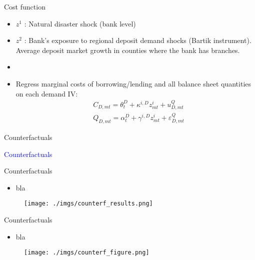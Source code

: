 \documentclass[notes,11pt, aspectratio=169]{beamer}
\begin{document}
      \begin{frame}{Cost function}\label{cost}
        \vspace{0.5cm}

          \begin{itemize}

\item  $z^1$ : Natural disaster shock (bank level)
\item  $z^2$ : Bank's exposure to regional deposit demand shocks (Bartik instrument). Average deposit market growth in counties where the bank has branches.
\item  
\item  Regress marginal costs of borrowing/lending and all balance sheet quantities on each demand IV: %
$$
\begin{aligned}
& C_{D, m t}=\theta_t^D+\kappa^{i, D} z_{m t}^i+u_{D, m t}^Q \\
& Q_{D, m t}=\alpha_t^D+\gamma^{i, D} z_{m t}^i+\varepsilon_{D, m t}^Q
\end{aligned}
$$

\end{itemize}
\end{frame}

\begin{frame}{Counterfactuals}
    \textcolor{blue}{\huge{\centerline{Counterfactuals}}}
\end{frame}

\begin{frame}{Counterfactuals}
    \vspace{0.5cm}
      \begin{itemize}
        \item  bla
      \end{itemize}
      
        \begin{figure}[t*]
          \centering
    
          \texttt{[image: ./imgs/counterf\_results.png]}
        \end{figure}
        
      \end{frame}

\begin{frame}{Counterfactuals}
    \vspace{0.5cm}
      \begin{itemize}
        \item  bla
      \end{itemize}
      
        \begin{figure}[t*]
          \centering
    
          \texttt{[image: ./imgs/counterf\_figure.png]}
        \end{figure}
        
      \end{frame}
\end{document}
